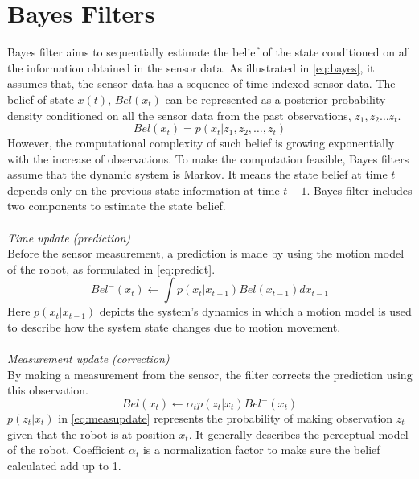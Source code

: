 \section{Bayes Filters}\label{sec:2.1}
Bayes filter aims to sequentially estimate the belief of the state conditioned on all the information obtained in the sensor data. As illustrated in \autoref{eq:bayes}, it assumes that, the sensor data has a sequence of time-indexed sensor data. The belief of state $x(t)$, $Bel(x_{t})$ can be represented as a posterior probability density conditioned on all the sensor data from the past observations, $z_{1}, z_{2} \ldots z_{t}$.
\begin{equation}
\label{eq:bayes}
Bel(x_{t}) = p(x_{t}|z_{1}, z_{2}, \ldots, z_{t})
\end{equation}
However, the computational complexity of such belief is growing exponentially with the increase of observations. To make the computation feasible, Bayes filters assume that the dynamic system is Markov. It means the state belief at time $t$ depends only on the previous state information at time $t-1$. Bayes filter includes two components to estimate the state belief.
\\
\\
\noindent \textit{Time update (prediction)}\\
Before the sensor measurement, a prediction is made by using the motion model of the robot, as formulated in \autoref{eq:predict}.
\begin{equation}
\label{eq:predict}
Bel^{-}(x_{t}) \leftarrow \int p(x_{t}|x_{t-1})Bel(x_{t-1})dx_{t-1}
\end{equation}
Here $p(x_{t}|x_{t-1})$ depicts the system's dynamics in which a motion model is used to describe how the system state changes due to motion movement.
\\
\\
\noindent \textit{Measurement update (correction)}\\
By making a measurement from the sensor, the filter corrects the prediction using this observation.
\begin{equation}
\label{eq:measupdate}
Bel(x_{t}) \leftarrow \alpha_{t}p(z_{t}|x_{t})Bel^{-}(x_{t})
\end{equation}
$p(z_{t}|x_{t})$ in \autoref{eq:measupdate} represents the probability of making observation $z_{t}$ given that the robot is at position $x_{t}$. It generally describes the perceptual model of the robot. Coefficient $\alpha_{t}$ is a normalization factor to make sure the belief calculated add up to 1.


